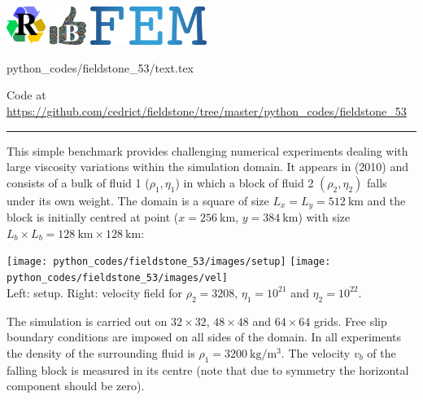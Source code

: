 \includegraphics[height=1.25cm]{images/pictograms/replication}
\includegraphics[height=1.25cm]{images/pictograms/benchmark}
\includegraphics[height=1.25cm]{images/pictograms/FEM}

\begin{flushright} {\tiny {\color{gray} python\_codes/fieldstone\_53/text.tex}} \end{flushright}



\begin{center}
Code at \url{https://github.com/cedrict/fieldstone/tree/master/python_codes/fieldstone_53}
\end{center}


\par\noindent\rule{\textwidth}{0.4pt}

This simple benchmark provides challenging numerical experiments 
dealing with large viscosity variations within the simulation
domain. It appears in \textcite{gery10} (2010) and consists of a bulk of fluid 1 ($\rho_1,\eta_1$)
in which a block of fluid 2 $(\rho_2,\eta_2)$ falls under its own
weight. The domain is a square of size $L_x=L_y=512~\si{\km}$ and the
block is initially centred at point ($x=256~\si{\km}$, $y=384~\si{\km}$) with size
$L_b\times L_b = 128~\si{\km}\times 128~\si{\km}$:

\begin{center}
\texttt{[image: python\_codes/fieldstone\_53/images/setup]}
\texttt{[image: python\_codes/fieldstone\_53/images/vel]}\\
{\captionfont Left: setup. Right: velocity field for $\rho_2=3208$, $\eta_1=10^{21}$
and $\eta_2=10^{22}$.}
\end{center}

The simulation is carried out on $32\times32$, $48\times48$ and $64\times 64$ grids. Free slip
boundary conditions are imposed on all sides of the domain. 
In all experiments the density of the surrounding fluid is $\rho_1=3200~\si{\kg\per\cubic\meter}$.
The velocity $v_b$ of the falling block is measured in its centre (note that due to symmetry 
the horizontal component should be zero).

